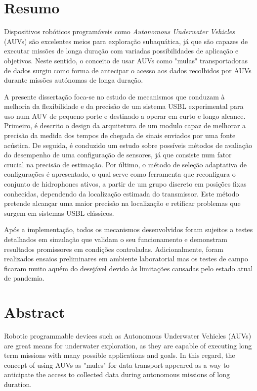 \chapter*{Resumo}
Dispositivos robóticos programáveis como \textit{Autonomous Underwater Vehicles} (AUVs) são excelentes meios para exploração subaquática, já que são capazes de executar missões de longa duração com variadas possibilidades de aplicação e objetivos. Neste sentido, o conceito de usar AUVs como "mulas" transportadoras de dados surgiu como forma de antecipar o acesso aos dados recolhidos por AUVs durante missões autónomas de longa duração.

A presente dissertação foca-se no estudo de mecanismos que conduzam à melhoria da flexibilidade e da precisão de um sistema USBL experimental para uso num AUV de pequeno porte e destinado a operar em curto e longo alcance. Primeiro, é descrito o design da arquitetura de um modulo capaz de melhorar a precisão da medida dos tempos de chegada de sinais enviados por uma fonte acústica. De seguida, é conduzido um estudo sobre possíveis métodos de avaliação do desempenho de uma configuração de sensores, já que consiste num fator crucial na precisão de estimação. Por último, o método de seleção adaptativa de configurações é apresentado, o qual serve como ferramenta que reconfigura o conjunto de hidrophones ativos, a partir de um grupo discreto em posições fixas conhecidas, dependendo da localização estimada do transmissor. Este método pretende alcançar uma maior precisão na localização e retificar problemas que surgem em sistemas USBL clássicos. 

Após a implementação, todos os mecanismos desenvolvidos foram sujeitos a testes detalhados em simulação que validam o seu funcionamento e demonstram resultados promissores em condições controladas. Adicionalmente, foram realizados ensaios preliminares em ambiente laboratorial mas os testes de campo ficaram muito aquém do desejável devido às limitações causadas pelo estado atual de pandemia.

\chapter*{Abstract}
Robotic programmable devices such as Autonomous Underwater Vehicles (AUVs) are great means for underwater exploration, as they are capable of executing long term missions with many possible applications and goals. In this regard, the concept of using AUVs as "mules" for data transport appeared as a way to anticipate the access to collected data during autonomous missions of long duration.

